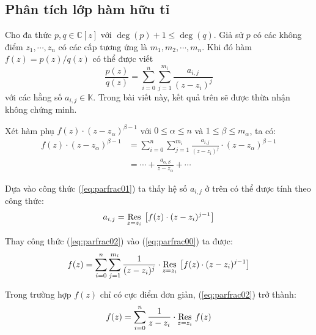 
	\subsection{Phân tích lớp hàm hữu tỉ}
	Cho đa thức \(p, q \in \mathbb C[z]\) với \(\deg(p) + 1 \le \deg(q)\). Giả sử \(p\) có các không điểm \(z_1,\cdots, z_n\) có các cấp tương ứng là \(m_1, m_2, \cdots, m_n\). Khi đó hàm \(f(z) = p(z)/q(z)\) có thể được viết
	\begin{equation}
		\frac{p(z)}{q(z)}  = \sum_{i = 0}^n \sum_{j = 1}^{m_i} \frac{a_{i,j}}{(z-z_i)^j}\label{eq:parfrac00}
	\end{equation}
	với các hằng số \(a_{i,j} \in \mathbb K\). Trong bài viết này, kết quả trên sẽ được thừa nhận không chứng minh.

	Xét hàm phụ \(f(z) \cdot (z - z_\alpha)^{\beta-1}\) với \(0\le\alpha\le n\) và \(1\le \beta\le m_\alpha\), ta có:
	\begin{align}
		f(z)\cdot(z-z_\alpha)^{\beta-1} &= \sum_{i=0}^n \sum_{j=1}^{m_i} \frac{a_{i,j}}{(z-z_i)^j}\cdot (z-z_\alpha)^{\beta-1}\\
		&= \cdots + \frac{a_{\alpha,\beta}}{z-z_\alpha} + \cdots \label{eq:parfrac01}
	\end{align}

	Dựa vào công thức (\ref{eq:parfrac01}) ta thấy hệ số \(a_{i,j}\) ở trên có thể được tính theo công thức:
	\begin{equation}
		a_{i,j} = \Res{\left[f(z)\cdot(z-z_i)^{j-1}\right]}{z=z_i}\label{eq:parfrac02}
	\end{equation}

	Thay công thức (\ref{eq:parfrac02}) vào (\ref{eq:parfrac00}) ta được:
	\begin{equation}
		f(z) = \sum_{i=0}^n\sum_{j=1}^{m_i} \frac{1}{(z-z_i)^j}\cdot \Res{\left[f(z)\cdot(z-z_i)^{j-1}\right]}{z=z_i} \label{eq:parfrac03}
	\end{equation}

	Trong trường hợp \(f(z)\) chỉ có cực điểm đơn giản, (\ref{eq:parfrac02}) trở thành:
	\begin{equation}
		f(z) = \sum_{i=0}^n \frac{1}{z-z_i}\cdot \Res{f(z)}{z=z_i}
	\end{equation}

